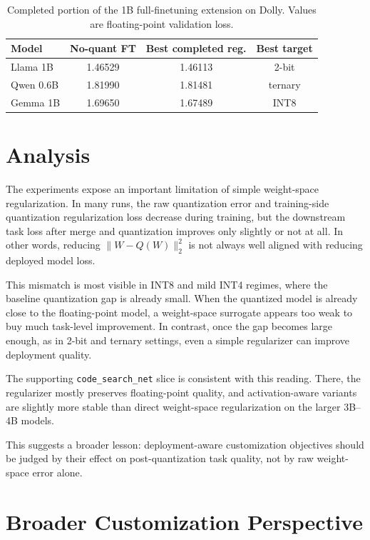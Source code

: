 \documentclass[11pt]{article}
\begin{document}
\begin{table}[t]
\centering
\small
\begin{tabular}{lccc}
\toprule
Model & No-quant FT & Best completed reg. & Best target \\
\midrule
Llama 1B & 1.46529 & 1.46113 & 2-bit \\
Qwen 0.6B & 1.81990 & 1.81481 & ternary \\
Gemma 1B & 1.69650 & 1.67489 & INT8 \\
\bottomrule
\end{tabular}
\caption{Completed portion of the 1B full-finetuning extension on Dolly. Values are floating-point validation loss.}
\label{tab:fullft-extension}
\end{table}

\section{Analysis}

The experiments expose an important limitation of simple weight-space regularization. In many runs, the raw quantization error and training-side quantization regularization loss decrease during training, but the downstream task loss after merge and quantization improves only slightly or not at all. In other words, reducing $\lVert W - Q(W)\rVert_2^2$ is not always well aligned with reducing deployed model loss.

This mismatch is most visible in INT8 and mild INT4 regimes, where the baseline quantization gap is already small. When the quantized model is already close to the floating-point model, a weight-space surrogate appears too weak to buy much task-level improvement. In contrast, once the gap becomes large enough, as in 2-bit and ternary settings, even a simple regularizer can improve deployment quality.

The supporting \texttt{code\_search\_net} slice is consistent with this reading. There, the regularizer mostly preserves floating-point quality, and activation-aware variants are slightly more stable than direct weight-space regularization on the larger 3B--4B models.

This suggests a broader lesson: deployment-aware customization objectives should be judged by their effect on post-quantization task quality, not by raw weight-space error alone.

\section{Broader Customization Perspective}
\end{document}
